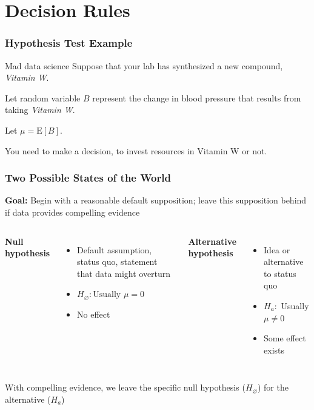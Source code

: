 \documentclass[12pt, block=fill]{beamer}
\newcommand{\E}{\text{E}}
\begin{document}
\section{Decision Rules}

\begin{frame}
  \frametitle{Hypothesis Test Example}

  \begin{exampleblock}{Mad data science}
    Suppose that your lab has synthesized a new compound, 
    \textit{Vitamin W}.

    Let random variable $B$ represent the change in blood pressure that results from taking
    \textit{Vitamin W}.
    
    Let $\mu = \E[B]$.

    You need to make a decision, to invest resources in Vitamin W or not. 
  \end{exampleblock}
  
   
 \end{frame}

\begin{frame}
  \frametitle{Two Possible States of the World}
  \textbf{Goal:} Begin with a reasonable default supposition; leave
  this supposition behind if data provides compelling evidence
  \begin{columns}[t]
    \textbf{Null hypothesis}
    \begin{itemize}
    \item Default assumption, status quo, statement that data might overturn
    \item  $H_\varnothing: \text{Usually } \mu=0$
    \item No effect
    \end{itemize}
    \textbf{Alternative hypothesis}
    \begin{itemize}
    \item Idea or alternative to status quo
    \item $H_a:$ Usually  $\mu \neq 0$
    \item Some effect exists
    \end{itemize}
  \end{columns}
  
  With compelling evidence, we leave the specific null hypothesis
  ($H_{\varnothing}$) for the alternative ($H_{a}$)
\end{frame}
\end{document}
